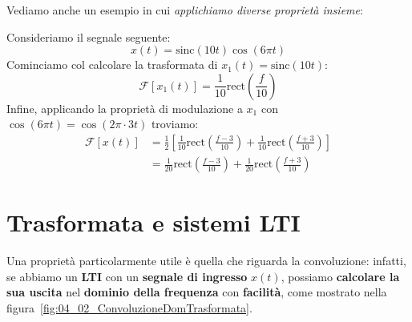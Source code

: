Vediamo anche un esempio in cui \textit{applichiamo diverse proprietà insieme}:

\begin{exa}
    Consideriamo il segnale seguente:
    \[
        x(t) = \text{sinc}(10t) \cos(6\pi t)
    \] 
    Cominciamo col calcolare la trasformata di $x_{1}(t)=\text{sinc}(10t)$:
    \[
        \mathcal{F}[x_{1}(t)] = \frac{1}{10} \text{rect} \left( \frac{f}{10} \right)
    \] 
    Infine, applicando la proprietà di modulazione a $x_{1}$ con 
    $\cos (6\pi t)=\cos (2\pi\cdot 3t)$ troviamo:
    \[
        \begin{aligned}
            \mathcal{F}[x(t)] &= \frac{1}{2} \left[ 
                \frac{1}{10}\text{rect} \left( \frac{f-3}{10} \right) +
                \frac{1}{10}\text{rect} \left( \frac{f+3}{10} \right)
            \right] \\ 
            &= \frac{1}{20}\text{rect} \left( \frac{f-3}{10} \right) +
            \frac{1}{20}\text{rect} \left( \frac{f+3}{10} \right)
        \end{aligned}
    \] 
\end{exa}

\section{Trasformata e sistemi LTI}

Una proprietà particolarmente utile è quella che riguarda la convoluzione: infatti, se
abbiamo un \textbf{LTI} con un \textbf{segnale di ingresso} $x(t)$, possiamo \textbf{calcolare
la sua uscita} nel \textbf{dominio della frequenza} con \textbf{facilità}, come mostrato nella
figura~\ref{fig:04_02_ConvoluzioneDomTrasformata}.

